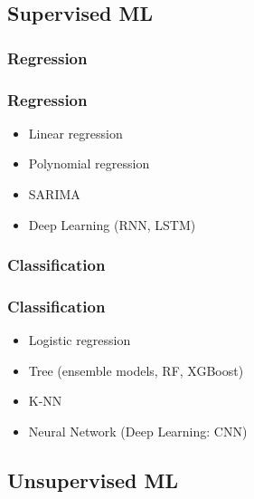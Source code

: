 \subsection{Supervised ML}

\subsubsection{Regression}

\begin{frame}\frametitle{Regression}
   \begin{itemize}
      \item Linear regression
      \item Polynomial regression
      \item SARIMA
      \item Deep Learning (RNN, LSTM)
   \end{itemize}
\end{frame}


\subsubsection{Classification}

\begin{frame}\frametitle{Classification}
   \begin{itemize}
      \item Logistic regression
      \item Tree (ensemble models, RF, XGBoost)
      \item K-NN
      \item Neural Network (Deep Learning: CNN)
   \end{itemize}
\end{frame}


\subsection{Unsupervised ML}


